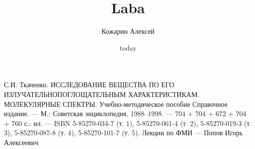 \documentclass[a4paper,12pt]{article}
\title{Laba}
\author{Кожарин Алексей}
\date{today}
\begin{document}

\renewcommand{\baselinestretch}{1.3}





\begin{thebibliography}{1}
	С.И. Ткаченко. ИССЛЕДОВАНИЕ ВЕЩЕСТВА ПО ЕГО ИЗЛУЧАТЕЛЬНОПОГЛОЩАТЕЛЬНЫМ ХАРАКТЕРИСТИКАМ.
	МОЛЕКУЛЯРНЫЕ СПЕКТРЫ. Учебно-методическое пособие
	Справочное издание. — М.: Советская энциклопедия, 1988–1998. — 704 + 704 + 672 + 704 + 760 с.: ил. — ISBN 5-85270-034-7 (т. 1), 5-85270-061-4 (т. 2), 5-85270-019-3 (т. 3), 5-85270-087-8 (т. 4), 5-85270-101-7 (т. 5).
	Лекции по ФМИ --- Попов Игорь Алексеевич
\end{thebibliography}

%
%
\end{document}
